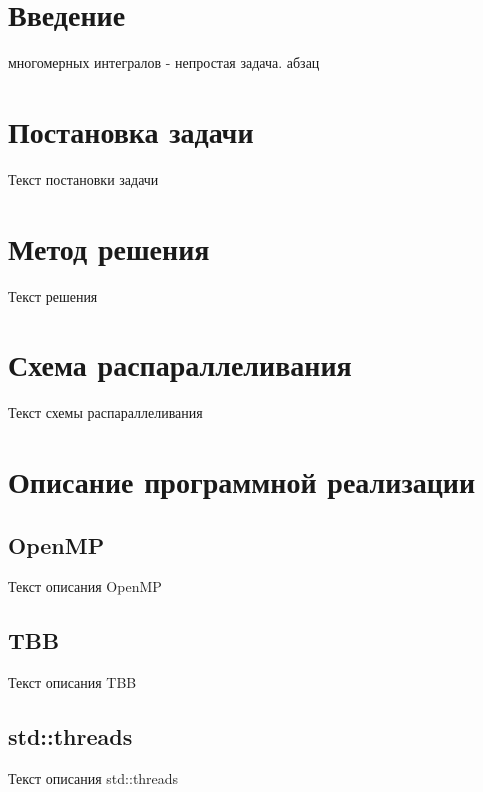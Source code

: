 \documentclass{report}
\begin{document}

\setcounter{page}{2}

\tableofcontents
\newpage

\section*{Введение}
\indent{} многомерных интегралов - непростая задача.
 абзац
\newpage

\section*{Постановка задачи}
Текст постановки задачи
\newpage

\section*{Метод решения}
Текст решения
\newpage

\section*{Схема распараллеливания}
Текст схемы распараллеливания
\newpage

\section*{Описание программной реализации}

\subsection*{OpenMP}
Текст описания OpenMP

\subsection*{TBB}
Текст описания TBB

\subsection*{std::threads}
Текст описания std::threads
\end{document}
